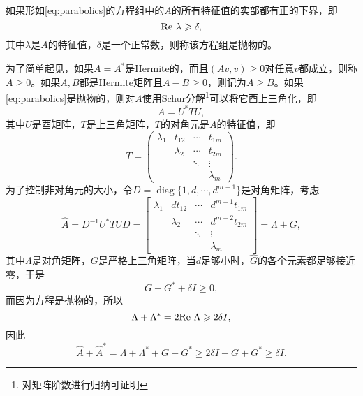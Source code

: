 \documentclass[a4paper,10pt]{ctexart}
\begin{document}
\begin{definition}
    如果形如\eqref{eq:parabolics}的方程组中的$ A $的所有特征值的实部都有正的下界，即
    \begin{equation}
        {\rm Re}\ \lambda \geqslant \delta,
    \end{equation}
    其中$ \lambda $是$ A $的特征值，$ \delta $是一个正常数，则称该方程组是抛物的。
\end{definition}

为了简单起见，如果$ A=A^* $是Hermite的，而且$ (Av,v)\geqslant 0 $对任意$ v $都成立，则称$ A\geqslant 0 $。如果$ A,B $都是Hermite矩阵且$ A-B\geqslant 0 $，则记为$ A\geqslant B $。如果\eqref{eq:parabolics}是抛物的，则对$ A $使用Schur分解\footnote{对矩阵阶数进行归纳可证明}可以将它酉上三角化，即
\[
    A = U^*TU,
\]
其中$ U $是酉矩阵，$ T $是上三角矩阵，$ T $的对角元是$ A $的特征值，即
\[
    T = 
    \begin{pmatrix}
        \lambda_1 & t_{12} & \cdots & t_{1m} \\
         & \lambda_2 & \cdots & t_{2m} \\
         & & \ddots & \vdots \\
         & & & \lambda_m
    \end{pmatrix}.
\]
为了控制非对角元的大小，令$ D = \operatorname{diag}\{1,d,\cdots ,d^{m-1}\} $是对角矩阵，考虑
\begin{equation}
    \hat{A} = D^{-1}U^*TUD = 
    \begin{bmatrix} 
        \lambda_1 & d t_{12} & \cdots & d^{m-1} t_{1m} \\
         & \lambda_2 & \cdots & d^{m-2} t_{2m} \\
         & & \ddots & \vdots \\
         & & & \lambda_m 
    \end{bmatrix} = 
    \Lambda + G ,
\end{equation}
其中$ \Lambda $是对角矩阵，$ G $是严格上三角矩阵，当$ d $足够小时，$ \hat{G} $的各个元素都足够接近零，于是
\begin{equation}
    G+G^*+\delta I\geqslant 0,
\end{equation}
而因为方程是抛物的，所以
\begin{equation}
    \Lambda + \Lambda^* = 2{\rm Re}\ \Lambda \geqslant 2\delta I,
\end{equation}
因此
\begin{equation}
    \hat{A} + \hat{A}^* = \Lambda + \Lambda^* + G + G^* \geqslant 2\delta I + G + G^* \geqslant \delta I.
\end{equation}
\end{document}
